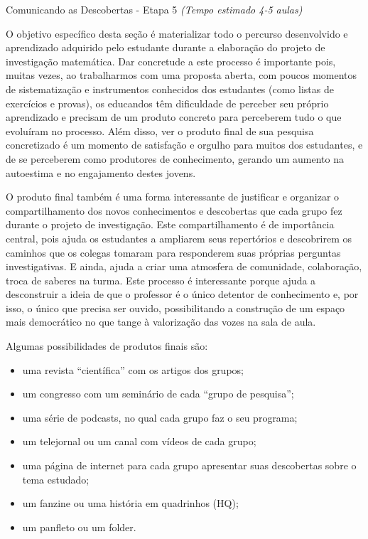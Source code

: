 \begin{paginatexto}{Comunicando as Descobertas - Etapa 5}
\textit{(Tempo estimado 4-5 aulas)}

O objetivo específico desta seção é materializar todo o percurso desenvolvido e aprendizado adquirido pelo estudante durante a elaboração do projeto de investigação matemática. Dar concretude a este processo é importante pois, muitas vezes, ao trabalharmos com uma proposta aberta, com poucos momentos de sistematização e instrumentos conhecidos dos estudantes (como listas de exercícios e provas), os educandos têm dificuldade de perceber seu próprio aprendizado e precisam de um produto concreto para perceberem tudo o que evoluíram no processo. 
Além disso, ver o produto final de sua pesquisa concretizado é um momento de satisfação e orgulho para muitos dos estudantes, e de se perceberem como produtores de conhecimento, gerando um aumento na autoestima e no engajamento destes jovens. 

O produto final também é uma forma interessante de justificar e organizar o compartilhamento dos novos conhecimentos e descobertas que cada grupo fez durante o projeto de investigação. Este compartilhamento é de importância central, pois ajuda os estudantes a ampliarem seus repertórios e descobrirem os caminhos que os colegas tomaram para responderem suas próprias perguntas investigativas. E ainda, ajuda a criar uma atmosfera de comunidade, colaboração, troca de saberes na turma. Este processo é interessante porque ajuda a desconstruir a ideia de que o professor é o único detentor de conhecimento e, por isso, o único que precisa ser ouvido, possibilitando a construção de um espaço mais democrático no que tange à valorização das vozes na sala de aula. 

Algumas possibilidades de produtos finais são:

\begin{itemize}
\item uma revista “científica” com os artigos dos grupos;
\item um congresso com um seminário de cada “grupo de pesquisa”;
\item uma série de podcasts, no qual cada grupo faz o seu programa;
\item um telejornal ou um canal com vídeos de cada grupo;
\item uma página de internet para cada grupo apresentar suas descobertas sobre o tema estudado;
\item um fanzine ou uma história em quadrinhos (HQ);
\item um panfleto ou um folder.
\end{itemize}


\end{paginatexto}
